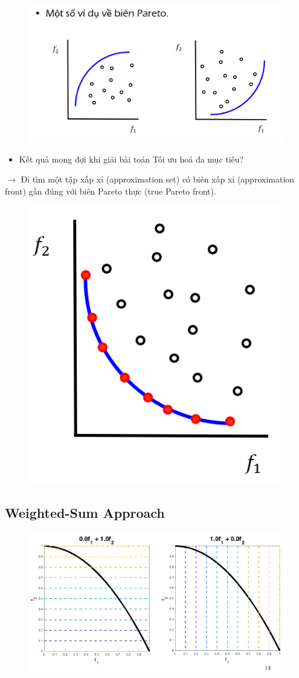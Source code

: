 \documentclass{book}
\begin{document}
\begin{figure}[H]
    \centering
    \includegraphics[width=0.75\linewidth]{images/GA-7-8_10.png}
\end{figure}

\begin{itemize}
    \item Kết quả mong đợi khi giải bài toán Tối ưu hoá đa mục tiêu?
\end{itemize}

$\rightarrow$ Đi tìm một tập xấp xỉ (approximation set) có biên xấp xỉ (approximation front) gần đúng với biên Pareto thực (true Pareto front).

\begin{figure}[H]
    \centering
    \includegraphics[width=0.5\linewidth]{images/GA-7-8_12.png}
\end{figure}

\subsection{Weighted-Sum Approach}
\begin{figure}[H]
    \centering
    \includegraphics[width=0.75\linewidth]{images/GA-7-8_13.png}
\end{figure}
\end{document}
